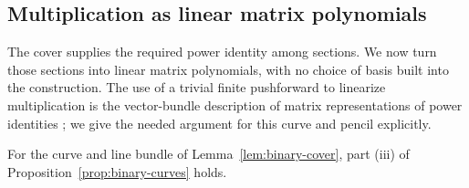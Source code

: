 \subsection{Multiplication as linear matrix polynomials}

The cover supplies the required power identity among sections.
We now turn those sections into linear matrix polynomials, with
no choice of basis built into the construction. The use of a trivial
finite pushforward to linearize multiplication is the vector-bundle
description of matrix representations of power identities
\cite{VanDenBergh87,Kulkarni03,CKM12}; we give the needed argument
for this curve and pencil explicitly.

\begin{lemma}\label{lem:binary-matrices}
For the curve and line bundle of Lemma~\ref{lem:binary-cover},
part \textup{(iii)} of Proposition~\ref{prop:binary-curves} holds.
\end{lemma}

